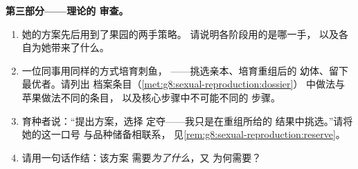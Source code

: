 \begin{problem}
\medskip\noindent\textbf{第三部分——理论的
审查。}
\begin{enumerate}[resume]
  \item 她的方案先后用到了果园的两手策略。
        请说明各阶段用的是哪一手，
        以及各自为她带来了什么。
  \item 一位同事用同样的方式培育刺鱼，
——挑选亲本、培育重组后的
        幼体、留下最优者。请列出
        档案条目（\cref{met:g8:sexual-reproduction:dossier}）
        中做法与苹果做法不同的条目，
        以及核心步骤中不可能不同的
        步骤。
  \item 育种者说：“提出方案，选择
        定夺——我只是在重组所给的
        结果中挑选。”请将她的这一口号
        与品种储备相联系，
        见\cref{rem:g8:sexual-reproduction:reserve}。
  \item 请用一句话作结：该方案
        需要\emph{为了什么}，又
        为何需要？
\end{enumerate}
\end{problem}
